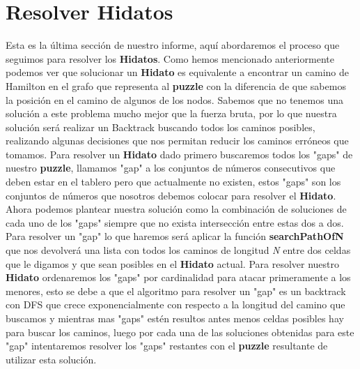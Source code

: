 \documentclass[12pt]{article}
\begin{document}
\section{Resolver Hidatos}
Esta es la \'ultima secci\'on de nuestro informe, aqu\'i abordaremos el proceso que seguimos para resolver los {\bf Hidatos}.
\newline
Como hemos mencionado anteriormente podemos ver que solucionar un {\bf Hidato} es equivalente a encontrar un camino de Hamilton en el grafo que representa al {\bf puzzle} con la diferencia de que sabemos la posici\'on en el camino de algunos de los nodos.
Sabemos que no tenemos una soluci\'on a este problema mucho mejor que la fuerza bruta, por lo que nuestra soluci\'on ser\'a realizar un Backtrack buscando todos los caminos posibles, realizando algunas decisiones que nos permitan reducir los caminos err\'oneos que tomamos.
Para resolver un {\bf Hidato} dado primero buscaremos todos los "gaps" de nuestro {\bf puzzle}, llamamos "gap" a los conjuntos de n\'umeros consecutivos que deben estar en el tablero pero que actualmente no existen, estos "gaps" son los conjuntos de n\'umeros que nosotros debemos colocar
para resolver el {\bf Hidato}. Ahora podemos plantear nuestra soluci\'on como la combinaci\'on de soluciones de cada uno de los "gaps" siempre que no exista intersecci\'on entre estas dos a dos. Para resolver un "gap" lo que haremos ser\'a aplicar la funci\'on {\bf searchPathOfN} que nos devolver\'a una lista
con todos los caminos de longitud {\it N} entre dos celdas que le digamos y que sean posibles en el {\bf Hidato} actual. Para resolver nuestro {\bf Hidato} ordenaremos los "gaps" por cardinalidad para atacar primeramente a los menores, esto se debe a que el algoritmo para resolver un "gap" es un backtrack con DFS que crece exponencialmente con 
respecto a la longitud del camino que buscamos y mientras mas "gaps" est\'en resultos antes menos celdas posibles hay para buscar los caminos, luego por cada una de las soluciones obtenidas para este "gap" intentaremos resolver los "gaps" restantes con el {\bf puzzle} resultante de utilizar esta soluci\'on.
\end{document}
